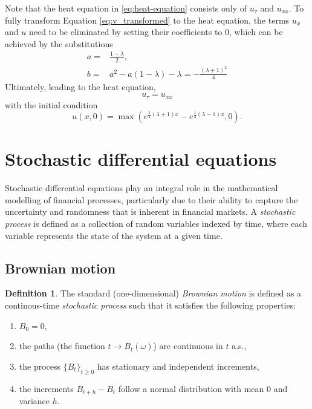 Note that the heat equation in \eqref{eq:heat-equation} consists only of $u_\tau$ and $u_{xx}$. 
To fully transform Equation \eqref{eq:v_transformed} to the heat equation, the terms $u_x$ and $u$ need to be eliminated by setting their coefficients to 0, which can be achieved by the substitutions
\begin{align} 
a ={}& \frac{1-\lambda}{2}, \\ 
b ={}& a^2-a(1-\lambda)-\lambda = -\frac{(\lambda+1)^2}{4}
\end{align}
Ultimately, leading to the heat equation,
\begin{equation}
    u_\tau = u_{xx}
\end{equation}
with the initial condition
\begin{equation}
    u(x,0) = \max(e^{\frac{1}{2} (\lambda + 1)x} - e^{\frac{1}{2} (\lambda - 1)x}, 0).
\end{equation}


\section{Stochastic differential equations}
\newtheorem{theorem}{Theorem}[section]
\theoremstyle{definition}
\newtheorem{definition}{Definition}[section]

Stochastic differential equations play an integral role in the mathematical modelling of financial processes, particularly due 
to their ability to capture the uncertainty and randomness that is inherent in financial markets. A \textit{stochastic process} is defined as a collection of random variables indexed by time,
where each variable represents the state of the system at a given time.

\subsection{Brownian motion}
\begin{definition}
    The standard (one-dimensional) \textit{Brownian motion} is defined as a continous-time \textit{stochastic process} such that it satisfies the following properties:
    \begin{enumerate}[(1)]
        \item $B_0 = 0$,
        \item the paths (the function $t \rightarrow B_t(\omega)$) are continuous in $t$ a.s.,
        \item the process $\{ B_t \}_{t \geq 0}$ has stationary and independent increments,
        \item the increments $B_{t+h} - B_t$ follow a normal distribution with mean 0 and variance $h$.
    \end{enumerate}
\end{definition}


